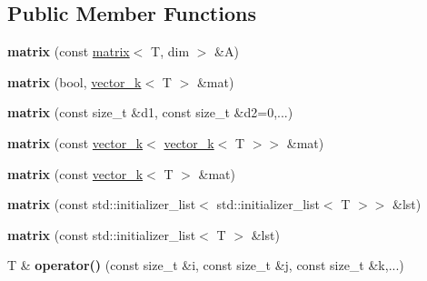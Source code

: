 \subsection*{Public Member Functions}
\begin{DoxyCompactItemize}
\item 
\hypertarget{classkeycpp_1_1matrix_aaff8deabd1aca849b288ffe9905c0183}{{\bfseries matrix} (const \hyperlink{classkeycpp_1_1matrix}{matrix}$<$ T, dim $>$ \&A)}\label{classkeycpp_1_1matrix_aaff8deabd1aca849b288ffe9905c0183}

\item 
\hypertarget{classkeycpp_1_1matrix_a08e0f5af92405fae766008d86bd4d9f6}{{\bfseries matrix} (bool, \hyperlink{classkeycpp_1_1vector__k}{vector\-\_\-k}$<$ T $>$ \&mat)}\label{classkeycpp_1_1matrix_a08e0f5af92405fae766008d86bd4d9f6}

\item 
\hypertarget{classkeycpp_1_1matrix_a1b6c5b038abdaa348e057426abb7fbf5}{{\bfseries matrix} (const size\-\_\-t \&d1, const size\-\_\-t \&d2=0,...)}\label{classkeycpp_1_1matrix_a1b6c5b038abdaa348e057426abb7fbf5}

\item 
\hypertarget{classkeycpp_1_1matrix_aec6b86d059d88ae9c02dcc8309c09d97}{{\bfseries matrix} (const \hyperlink{classkeycpp_1_1vector__k}{vector\-\_\-k}$<$ \hyperlink{classkeycpp_1_1vector__k}{vector\-\_\-k}$<$ T $>$$>$ \&mat)}\label{classkeycpp_1_1matrix_aec6b86d059d88ae9c02dcc8309c09d97}

\item 
\hypertarget{classkeycpp_1_1matrix_a3b8bc665d15dd7e20fc6a72c8c995232}{{\bfseries matrix} (const \hyperlink{classkeycpp_1_1vector__k}{vector\-\_\-k}$<$ T $>$ \&mat)}\label{classkeycpp_1_1matrix_a3b8bc665d15dd7e20fc6a72c8c995232}

\item 
\hypertarget{classkeycpp_1_1matrix_acf5cdf8a8d5396420b87a188483a6cb3}{{\bfseries matrix} (const std\-::initializer\-\_\-list$<$ std\-::initializer\-\_\-list$<$ T $>$$>$ \&lst)}\label{classkeycpp_1_1matrix_acf5cdf8a8d5396420b87a188483a6cb3}

\item 
\hypertarget{classkeycpp_1_1matrix_a23a9ee6ced1a3797a8fd974a7d3b0803}{{\bfseries matrix} (const std\-::initializer\-\_\-list$<$ T $>$ \&lst)}\label{classkeycpp_1_1matrix_a23a9ee6ced1a3797a8fd974a7d3b0803}

\item 
\hypertarget{classkeycpp_1_1matrix_ab7d6c3bda37ffcfb007105fb150dedd1}{T \& {\bfseries operator()} (const size\-\_\-t \&i, const size\-\_\-t \&j, const size\-\_\-t \&k,...)}\label{classkeycpp_1_1matrix_ab7d6c3bda37ffcfb007105fb150dedd1}


\end{DoxyCompactItemize}

